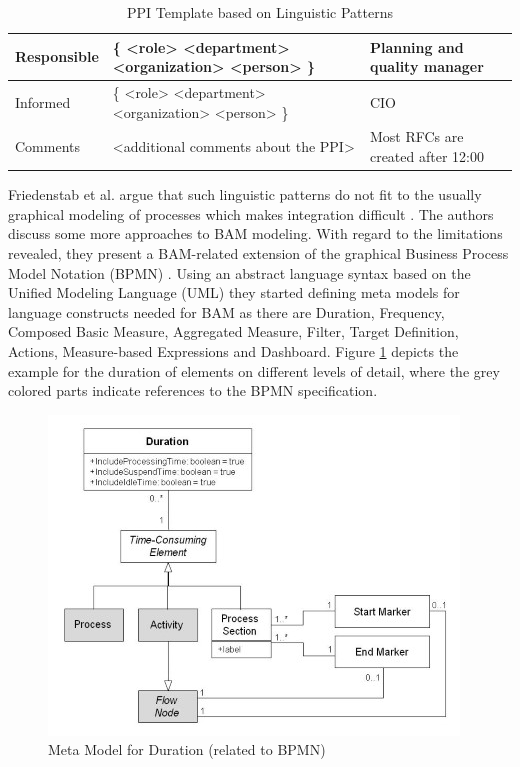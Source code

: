 \begin{table}[htbp]
\begin{tabular}[t]{ p{2 cm} p{5 cm} p{5 cm} }
		\\
		\midrule
		Responsible & \{ <role> \textbar <department> \textbar <organization> \textbar <person> \} &	Planning and quality manager
		\\
		\midrule
		Informed & \{ <role> \textbar <department> \textbar <organization> \textbar <person> \} & CIO
		\\
		\midrule
		Comments & <additional comments about the PPI> & Most RFCs are created after 12:00
		\\
\bottomrule
\end{tabular}
\caption{PPI Template based on Linguistic Patterns \cite{article:ProcessPerfInd}}
\label{tbl:Fact-Sheet-PPI}
\end{table}





Friedenstab et al. argue that such linguistic patterns do not fit to the usually graphical modeling of processes which makes integration difficult \cite{article:BPMNActivityMon}. The authors discuss some more approaches to BAM modeling. With regard to the limitations revealed, they present a BAM-related extension of the graphical Business Process Model Notation (BPMN) \cite{article:BPMNActivityMon}.
Using an abstract language syntax based on the Unified Modeling Language (UML) they started defining meta models for language constructs needed for BAM as there are Duration, Frequency, Composed Basic Measure, Aggregated Measure, Filter, Target Definition, Actions, Measure-based Expressions and Dashboard. Figure \ref{fig:Meta-Model} depicts the example for the duration of elements on different levels of detail, where the grey colored parts indicate references to the BPMN specification.

\begin{figure}[htbp]
	\centering
	\includegraphics[width=0.9\linewidth]{Figures/Chapter5/Monitoring/Meta-Mode-fo-Duration-relate-to-BPMN-1.jpg}
	\caption[Meta Model for Duration (related to BPMN) 12]{Meta Model for Duration (related to BPMN) \cite{article:BPMNActivityMon}}
	\label{fig:Meta-Model}
\end{figure}


